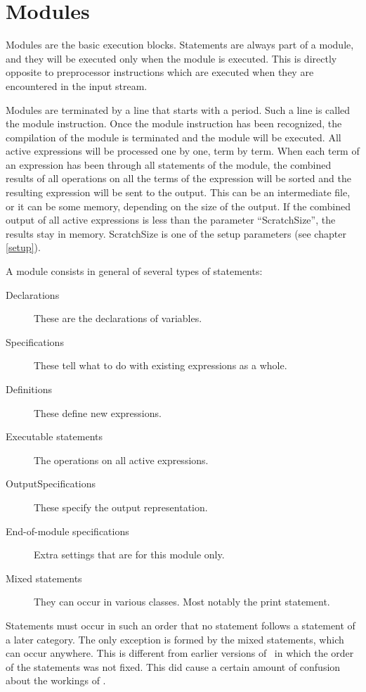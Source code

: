 
\chapter{Modules}
\label{modules}

Modules are the basic execution blocks. 
Statements are always part of a module, and they will be 
executed only when the module is executed. This is directly opposite to 
preprocessor instructions which are executed when they are encountered in 
the input stream.

Modules are terminated by a line that starts with a period. 
Such a line is called the module instruction. 
Once the module instruction has been recognized, the compilation of the 
module is terminated and the module will be executed. All active 
expressions will be processed one by one, term by term. When each term of 
an expression has been through all statements of the module, the combined 
results of all operations on all the terms of the expression will be sorted 
and the resulting expression will be sent to the output. This can be an 
intermediate file, or it can be some 
memory, depending on the size of the output. If the combined 
output of all active expressions is less than the parameter 
``ScratchSize'', the results stay in memory. ScratchSize 
is one of the setup parameters (see chapter \ref{setup}).

A module consists in general of several types of statements:
\begin{description}
\item [Declarations] These are the declarations of 
variables.
\item [Specifications] These tell what to do with 
existing expressions as a whole.
\item [Definitions] These define new expressions.
\item [Executable statements] The operations 
on all active expressions.
\item [OutputSpecifications] These specify the 
output representation.
\item [End-of-module specifications] 
Extra settings that are for this module only.
\item [Mixed statements] They can occur in various 
classes. Most notably the print statement.
\end{description}
Statements must occur in such an order that no statement follows a 
statement of a later category. The only exception is formed by the mixed 
statements, which can occur anywhere. This is different from earlier 
versions of \FORM\ in which the order of the statements was not fixed. This 
did cause a certain amount of confusion about the workings of \FORM.

